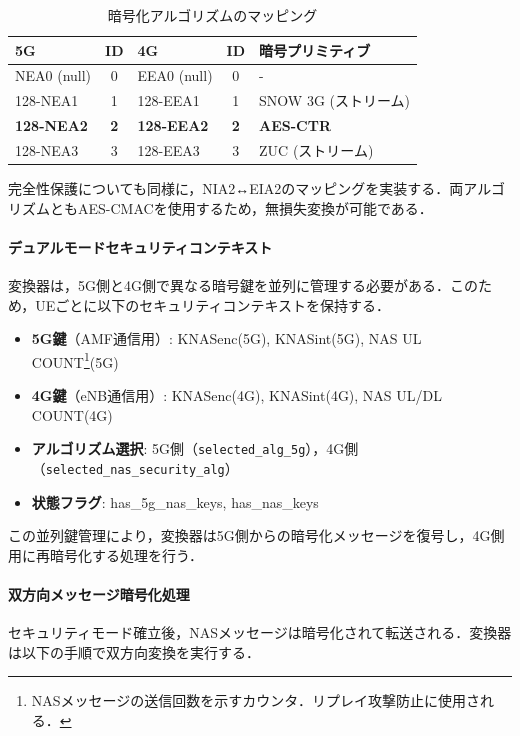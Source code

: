 \begin{table}[h]
\centering
\caption{暗号化アルゴリズムのマッピング}
\label{tab:algorithm_mapping}
\begin{tabular}{|l|c|l|c|l|}
\hline
\textbf{5G} & \textbf{ID} & \textbf{4G} & \textbf{ID} & \textbf{暗号プリミティブ} \\
\hline
NEA0 (null) & 0 & EEA0 (null) & 0 & - \\
128-NEA1 & 1 & 128-EEA1 & 1 & SNOW 3G (ストリーム) \\
\textbf{128-NEA2} & \textbf{2} & \textbf{128-EEA2} & \textbf{2} & \textbf{AES-CTR} \\
128-NEA3 & 3 & 128-EEA3 & 3 & ZUC (ストリーム) \\
\hline
\end{tabular}
\end{table}

完全性保護についても同様に，NIA2↔EIA2のマッピングを実装する．両アルゴリズムともAES-CMACを使用するため，無損失変換が可能である．

\paragraph{デュアルモードセキュリティコンテキスト}
変換器は，5G側と4G側で異なる暗号鍵を並列に管理する必要がある．このため，UEごとに以下のセキュリティコンテキストを保持する．

\begin{itemize}
\item \textbf{5G鍵}（AMF通信用）: KNASenc(5G), KNASint(5G), NAS UL COUNT\footnote{NASメッセージの送信回数を示すカウンタ．リプレイ攻撃防止に使用される．}(5G)
\item \textbf{4G鍵}（eNB通信用）: KNASenc(4G), KNASint(4G), NAS UL/DL COUNT(4G)
\item \textbf{アルゴリズム選択}: 5G側（\texttt{selected\_alg\_5g}），4G側（\texttt{selected\_nas\_security\_alg}）
\item \textbf{状態フラグ}: has\_5g\_nas\_keys, has\_nas\_keys
\end{itemize}

この並列鍵管理により，変換器は5G側からの暗号化メッセージを復号し，4G側用に再暗号化する処理を行う．

\paragraph{双方向メッセージ暗号化処理}
セキュリティモード確立後，NASメッセージは暗号化されて転送される．変換器は以下の手順で双方向変換を実行する．

